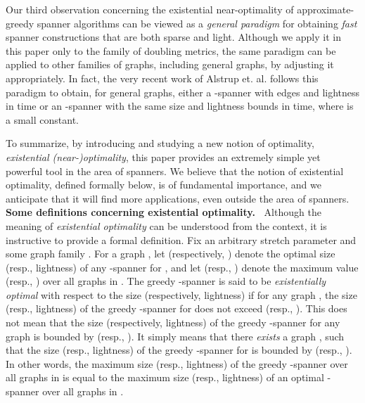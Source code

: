 \documentclass[11pt,letterpaper]{article}
\begin{document}
\begin{enumerate}
	\vspace{5pt}	
	Our third observation concerning the existential near-optimality of approximate-greedy spanner algorithms
	can be viewed as a \emph{general paradigm} for obtaining \emph{fast} spanner constructions that are both sparse and light.
	Although we apply it in this paper only to the family of doubling metrics, the same paradigm can be applied to other families of graphs, including general graphs, by adjusting it appropriately. In fact, the very recent work of Alstrup et. al. \cite{ADFSW19} follows this paradigm to obtain, for general graphs,
	either a -spanner with  edges and  lightness
	in  time
	or an -spanner with the same size and lightness bounds in  time, where  is a small constant.
\end{enumerate}


To summarize, by introducing and studying a new notion of optimality, \emph{existential (near-)optimality},
this paper provides an extremely simple yet powerful tool in the area of spanners.
We believe that the notion of existential optimality, defined formally below, is of fundamental importance, and we anticipate that it will find more applications, even outside the area of spanners.
\vspace{7pt}
\\
\noindent
{\bf Some definitions concerning existential optimality.~}
Although the meaning of \emph{existential optimality} can be   understood from the context, it is instructive to provide a formal definition.
Fix an arbitrary stretch parameter  and some graph family .
For a graph , let  (respectively, )
denote the optimal size (resp., lightness) of any -spanner for ,
and let 
(resp., )
denote the maximum value  (resp., ) over all graphs  in .
The greedy -spanner is said to be \emph{existentially optimal} with respect to the size (respectively, lightness) if
for any graph , the size (resp., lightness) of the greedy -spanner for  does not exceed   (resp., ).
This does not mean that the size (respectively, lightness) of the greedy  -spanner
for any graph  is bounded by  (resp., ).
It simply means that there \emph{exists} a graph ,
such that the size (resp., lightness) of the greedy -spanner for  is bounded by  (resp., ).
In other words, the maximum size (resp., lightness) of the greedy -spanner over all graphs in 
is equal to the maximum size (resp., lightness) of an optimal -spanner over all graphs in .
\end{document}
